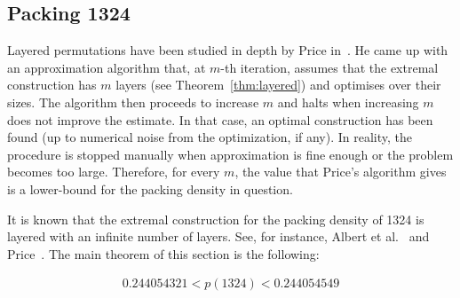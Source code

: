 \documentclass[12pt, a4paper, twoside]{report}
\begin{document}
\subsection{Packing 1324}
Layered permutations have been studied in depth by Price in~\cite{price1997packing}. He came up with an approximation algorithm that, at $m$-th iteration, assumes that the extremal construction has $m$ layers (see Theorem~\ref{thm:layered}) and optimises over their sizes. The algorithm then proceeds to increase $m$ and halts when increasing $m$ does not improve the estimate. In that case, an optimal construction has been found (up to numerical noise from the optimization, if any). In reality, the procedure is stopped manually when approximation is fine enough or the problem becomes too large. Therefore, for every $m$, the value that Price's algorithm gives is a lower-bound for the packing density in question.

It is known that the extremal construction for the packing density of 1324 is layered with an infinite number of layers. See, for instance, Albert et al.~\cite{albert2002packing} and Price~\cite{price1997packing}. The main theorem of this section is the following: 
\begin{theorem}
\label{thm:pack1324}
\begin{align*}
0.244054321 < p(1324) < 0.244054549
\end{align*}
\end{theorem}
\end{document}
